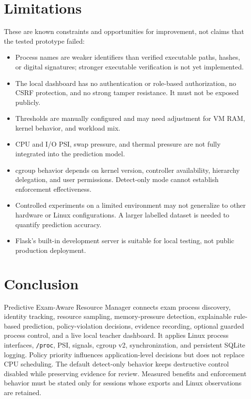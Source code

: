 \documentclass[12pt,a4paper]{article}
\newcommand{\project}{Predictive Exam-Aware Resource Manager}
\newcommand{\code}[1]{\texttt{#1}}
\begin{document}
\section{Limitations}
These are known constraints and opportunities for improvement, not claims that the tested prototype failed:
\begin{itemize}
\item Process names are weaker identifiers than verified executable paths, hashes, or digital signatures; stronger executable verification is not yet implemented.
\item The local dashboard has no authentication or role-based authorization, no CSRF protection, and no strong tamper resistance. It must not be exposed publicly.
\item Thresholds are manually configured and may need adjustment for VM RAM, kernel behavior, and workload mix.
\item CPU and I/O PSI, swap pressure, and thermal pressure are not fully integrated into the prediction model.
\item cgroup behavior depends on kernel version, controller availability, hierarchy delegation, and user permissions. Detect-only mode cannot establish enforcement effectiveness.
\item Controlled experiments on a limited environment may not generalize to other hardware or Linux configurations. A larger labelled dataset is needed to quantify prediction accuracy.
\item Flask's built-in development server is suitable for local testing, not public production deployment.
\end{itemize}

\section{Conclusion}
\project{} connects exam process discovery, identity tracking, resource sampling, memory-pressure detection, explainable rule-based prediction, policy-violation decisions, evidence recording, optional guarded process control, and a live local teacher dashboard. It applies Linux process interfaces, \code{/proc}, PSI, signals, cgroup v2, synchronization, and persistent SQLite logging. Policy priority influences application-level decisions but does not replace CPU scheduling. The default detect-only behavior keeps destructive control disabled while preserving evidence for review. Measured benefits and enforcement behavior must be stated only for sessions whose exports and Linux observations are retained.
\end{document}
